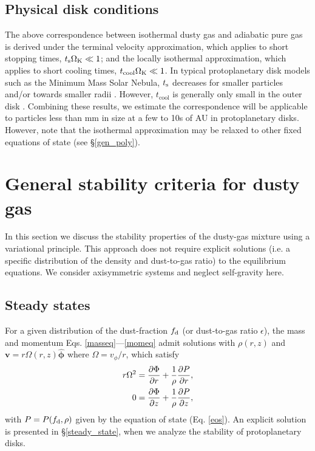 \subsection{Physical disk conditions}
The above correspondence between isothermal dusty gas and adiabatic
pure gas is derived under the terminal velocity approximation, which applies
to short stopping times, $t_\mathrm{s}\Omega_{\rm K}\ll 1$; and the locally isothermal
approximation, which applies to short cooling times, $t_\mathrm{cool}\Omega_{\rm K}\ll
1$. In typical protoplanetary disk
models such as the Minimum Mass Solar Nebula, $t_\mathrm{s}$ decreases for
smaller particles and/or towards smaller radii \citep{youdin11}. However,
$t_\mathrm{cool}$ is generally only small in the outer disk
\citep{lin15,malygin17}. Combining these results, we estimate the 
correspondence will be applicable to particles less than mm in size at a few
to 10s of AU in protoplanetary disks. However, note that the
isothermal approximation may be relaxed to other fixed equations of
state (see \S\ref{gen_poly}). 


\section{General stability criteria for dusty gas}\label{limits}

In this section we discuss the stability properties of the 
dusty-gas mixture using a variational principle. This approach does not
require explicit solutions (i.e. a specific distribution of the density and dust-to-gas ratio)  
to the equilibrium equations. We consider axisymmetric systems and neglect self-gravity here.  

\subsection{Steady states}\label{eqm}

For a given distribution of the dust-fraction $f_\mathrm{d}$ (or
dust-to-gas ratio $\epsilon$), the 
mass and momentum Eqs. \ref{masseq}---\ref{momeq} admit     
solutions with $\rho(r,z)$ and 
$\bm{v}=r\Omega(r,z)\hat{\bm{\phi}}$ where $\Omega = v_\phi/r$, which satisfy 
\begin{align}
  r\Omega^2 &= \frac{\partial \Phi}{\partial r} + \frac{1}{\rho}\frac{\partial P}{\partial
    r},\label{steady_momr}\\
  0 & = \frac{\partial\Phi}{\partial z} + \frac{1}{\rho}\frac{\partial P}{\partial z},\label{steady_momz}
\end{align}
with $P=P(f_\mathrm{d},\rho)$ given by the equation of state
(Eq. \ref{eos}). An explicit solution is presented in 
\S\ref{steady_state}, when we analyze the stability of
protoplanetary disks. 

